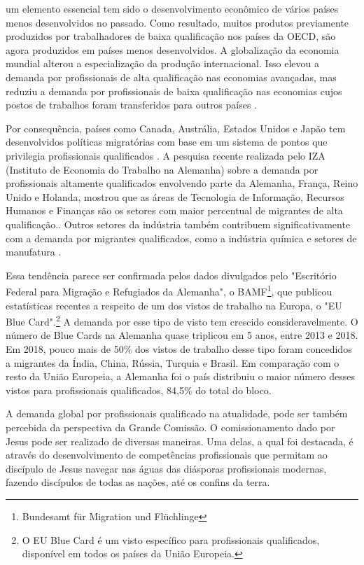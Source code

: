 \documentclass[12pt,openright,oneside,a4paper]{abntex2}
\begin{document}
\begin{citacao} um elemento essencial tem sido o desenvolvimento econômico de vários países menos desenvolvidos no passado. Como resultado, muitos produtos previamente produzidos por trabalhadores de baixa qualificação nos países da OECD, são agora produzidos em países menos desenvolvidos. A globalização da economia mundial alterou a especialização da produção internacional. Isso elevou a demanda por profissionais de alta qualificação nas economias avançadas, mas reduziu a demanda por profissionais de baixa qualificação nas economias cujos postos de trabalhos foram transferidos para outros países \cite[p. 3]{chiswick_high_2005}. \end{citacao}

Por consequência, países como Canada, Austrália, Estados Unidos e Japão tem desenvolvidos políticas migratórias com base em um sistema de pontos que privilegia profissionais qualificados \cite[p. 6]{chiswick_high_2005}. A pesquisa recente realizada pelo IZA (Instituto de Economia do Trabalho na Alemanha) sobre a demanda por profissionais altamente qualificados envolvendo parte da Alemanha, França, Reino Unido e Holanda, mostrou que as áreas de Tecnologia de Informação, Recursos Humanos e Finanças são os setores com maior percentual de migrantes de alta qualificação.\cite[p. 7]{bauer_demand_2004}. Outros setores da indústria também contribuem significativamente com a demanda por migrantes qualificados, como a indústria química e setores de manufatura \cite[p. 18]{bauer_demand_2004}.

Essa tendência parece ser confirmada pelos dados divulgados pelo "Escritório Federal para Migração e Refugiados da Alemanha", o BAMF\footnote{Bundesamt für Migration und Flüchlinge}, que publicou estatísticas recentes a respeito de um dos vistos de trabalho na Europa, o "EU Blue Card".\footnote{O EU Blue Card é um visto específico para profissionais qualificados, disponível em todos os países da União Europeia.} A demanda por esse tipo de visto tem crescido consideravelmente. O número de Blue Cards na Alemanha quase triplicou em 5 anos, entre 2013 e 2018. Em 2018, pouco mais de 50\% dos vistos de trabalho desse tipo foram concedidos a migrantes da Índia, China, Rússia, Turquia e Brasil. Em comparação com o resto da União Europeia, a Alemanha foi o país distribuiu o maior número desses vistos para profissionais qualificados, 84,5\% do total do bloco\cite{bamf}.

A demanda global por profissionais qualificado na atualidade, pode ser também percebida da perspectiva da Grande Comissão. O comissionamento dado por Jesus pode ser realizado de diversas maneiras. Uma delas, a qual foi destacada, é através do desenvolvimento de competências profissionais que permitam ao discípulo de Jesus navegar nas águas das diásporas profissionais modernas, fazendo discípulos de todas as nações, até os confins da terra.
\end{document}

